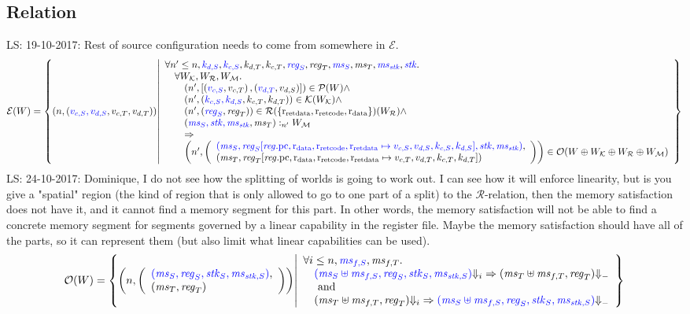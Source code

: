 \documentclass[a3paper]{article}
\newcommand\lau[1]{{\color{purple} \sf \footnotesize {LS: #1}}\\}
\newcommand{\npair}[2][n]{\left(#1,#2\right)}
\newcommand{\tand}{\text{ and }}
\newcommand{\typesetlr}[1]{\mathcal{#1}}
\newcommand{\lre}{\typesetlr{E}}
\newcommand{\lrk}{\typesetlr{K}}
\newcommand{\lrr}{\typesetlr{R}}
\newcommand{\lro}{\typesetlr{O}}
\newcommand{\lrp}{\typesetlr{P}}
\newcommand{\lrm}{\typesetlr{M}}
\newcommand{\stpair}[3][]{
\ifthenelse{\equal{#1}{}}
{\left(\src{#2_S},#3_T\right)}
{\left(\src{#2},#3\right)}}
\newcommand{\memSat}[3][n]{#2 :_{#1}#3}
\newcommand{\sourcecolor}{\color{blue}}
\newcommand{\src}[1]{{\sourcecolor #1}}
\newcommand{\update}[2]{[#1 \mapsto #2]}
\newcommand{\updReg}[2]{\update{\reg.#1}{#2}}
\newcommand{\term}[1][-]{{\Downarrow_{#1}}}
\newcommand{\var}[1]{\mathit{#1}}
\newcommand{\reg}{\var{reg}}
\newcommand{\ms}{\var{ms}}
\newcommand{\stk}{\var{stk}}
\newcommand{\pcreg}{\mathrm{pc}}
\newcommand{\rretc}{\mathrm{r}_\mathrm{ret code}}
\newcommand{\rretd}{\mathrm{r}_\mathrm{ret data}}
\newcommand{\rdata}{\mathrm{r}_\mathrm{data}}
\begin{document}
\subsection{Relation}
\lau{19-10-2017: Rest of source configuration needs to come from somewhere in $\lre$.}
\[
  \lre(W) = \left\{ \npair{\stpair[.]{v_{c,S},v_{d,S}}{v_{c,T},v_{d,T}}} \middle| 
    \begin{array}{l}
      \forall n' \leq n, \src{k_{d,S}}, \src{k_{c,S}}, k_{d,T}, k_{c,T}, \src{\reg_S}, \reg_T, \src{\ms_S}, \ms_T, \src{\ms_\stk}, \src{\stk} \ldotp\\
      \quad \forall W_\lrk, W_\lrr, W_\lrm \ldotp \\
      \qquad\npair[n']{[\stpair[.]{v_{c,S}}{v_{c,T}},\stpair[.]{v_{d,T}}{v_{d,S}}]} \in \lrp(W) \wedge \\
      \qquad\npair[n']{\stpair[.]{k_{c,S},k_{d,S}}{k_{c,T},k_{d,T}}} \in \lrk(W_\lrk) \wedge \\
      \qquad\npair[n']{\stpair{\reg}{\reg}} \in \lrr(\{\rretd,\rretc,\rdata\})(W_\lrr) \wedge\\
      \qquad\memSat[n']{\stpair[.]{\ms_S,\stk,\ms_\stk}{\ms_T}}{W_\lrm} \\
      \qquad\Rightarrow\\
      \qquad\npair[n']{\left(\array{l}\src{(\ms_S,\reg_S\updReg{\pcreg,\rdata,\rretc,\rretd}{v_{c,S},v_{d,S},k_{c,S},k_{d,S}},\stk, \ms_\stk)},\\
                                          (\ms_T,\reg_T\updReg{\pcreg,\rdata,\rretc,\rretd}{v_{c,T},v_{d
,T},k_{c,T},k_{d,T}})\endarray\right)}
      \in \lro(W\oplus W_\lrk \oplus W_\lrr \oplus W_\lrm)
    \end{array}
    \right\}
\]
\lau{24-10-2017: Dominique, I do not see how the splitting of worlds is going to work out. I can see how it will enforce linearity, but is you give a "spatial" region (the kind of region that is only allowed to go to one part of a split) to the $\lrr$-relation, then the memory satisfaction does not have it, and it cannot find a memory segment for this part. In other words, the memory satisfaction will not be able to find a concrete memory segment for segments governed by a linear capability in the register file. Maybe the memory satisfaction should have all of the parts, so it can represent them (but also limit what linear capabilities can be used).}

\[
  \lro(W) = \left\{ \npair{\left(\array{l}\src{(\ms_S,\reg_S,\stk_S,\ms_{\stk,S})},\\(\ms_T,\reg_T)\endarray\right)} \middle|
    \begin{array}{l}
      \forall i \leq n, \src{\ms_{f,S}}, \ms_{f,T} \ldotp \\
      \quad \src{(\ms_S \uplus \ms_{f,S},\reg_S,\stk_S,\ms_{\stk,S})} \term[i] \Rightarrow (\ms_T \uplus \ms_{f,T},\reg_T) \term\\
      \quad \tand\\
      \quad (\ms_T \uplus \ms_{f,T},\reg_T) \term[i] \Rightarrow \src{(\ms_S \uplus \ms_{f,S},\reg_S,\stk_S,\ms_{\stk,S})} \term
    \end{array}
\right\}
\]
\end{document}
